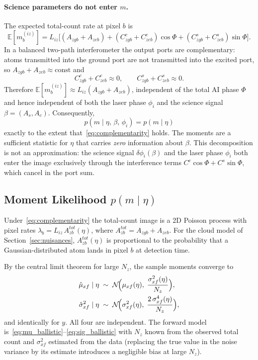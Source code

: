 \documentclass[11pt,a4paper]{article}
\newcommand{\E}{\mathbb{E}}
\begin{document}
\paragraph{Science parameters do not enter $m$.}
The expected total-count rate at pixel $b$ is
\begin{equation}
  \E[m_b^{(iz)}]
  = L_{iz}\bigl[(A_{zgb}+A_{zeb})
    + (C^c_{zgb}+C^c_{zeb})\cos\Phi
    + (C^s_{zgb}+C^s_{zeb})\sin\Phi\bigr].
  \label{eq:Emtot}
\end{equation}
In a balanced two-path interferometer the output ports are complementary:
atoms transmitted into the ground port are not transmitted into the excited port,
so $A_{zgb}+A_{zeb} \approx \text{const}$ and
\begin{equation}
  C^c_{zgb}+C^c_{zeb} \approx 0,\qquad C^s_{zgb}+C^s_{zeb} \approx 0.
  \label{eq:complementarity}
\end{equation}
Therefore $\E[m_b^{(iz)}] \approx L_{iz}(A_{zgb}+A_{zeb})$, independent of
the total AI phase $\Phi$ and hence independent of both the laser phase
$\phi_i$ and the science signal $\beta = (A_s, A_c)$.  Consequently,
\begin{equation}
  \boxed{p(m \mid \eta,\,\beta,\,\phi_i) = p(m \mid \eta)}
  \label{eq:marg_key}
\end{equation}
exactly to the extent that~\eqref{eq:complementarity} holds.  The moments
are a sufficient statistic for $\eta$ that carries \emph{zero} information
about $\beta$.  This decomposition is not an approximation: the science signal
$\delta\phi_i(\beta)$ and the laser phase $\phi_i$ both enter the image
exclusively through the interference terms $C^c\cos\Phi + C^s\sin\Phi$,
which cancel in the port sum.

\subsection{Moment Likelihood $p(m \mid \eta)$}

Under~\eqref{eq:complementarity} the total-count image is a 2D Poisson
process with pixel rates $\lambda_b = L_{iz}\,A^{tot}_{zb}(\eta)$, where
$A^{tot}_{zb} = A_{zgb}+A_{zeb}$.  For the cloud model of
Section~\ref{sec:nuisances}, $A^{tot}_{zb}(\eta)$ is proportional to the
probability that a Gaussian-distributed atom lands in pixel $b$ at
detection time.

By the central limit theorem for large $N_z$, the sample moments converge to
\begin{align}
  \hat\mu_{xf} \mid \eta
  &\;\sim\; \mathcal{N}\!\Bigl(\mu_{xf}(\eta),\;\frac{\sigma^2_{xf}(\eta)}{N_z}\Bigr),
  \label{eq:mu_lik}\\
  \hat\sigma^2_{xf} \mid \eta
  &\;\sim\; \mathcal{N}\!\Bigl(\sigma^2_{xf}(\eta),\;\frac{2\,\sigma^4_{xf}(\eta)}{N_z}\Bigr),
  \label{eq:sig_lik}
\end{align}
and identically for $y$.  All four are independent.  The forward model
is~\eqref{eq:mu_ballistic}--\eqref{eq:sig_ballistic} with $N_z$ known from
the observed total count and $\sigma^2_{xf}$ estimated from the data
(replacing the true value in the noise variance by its estimate introduces
a negligible bias at large $N_z$).
\end{document}

